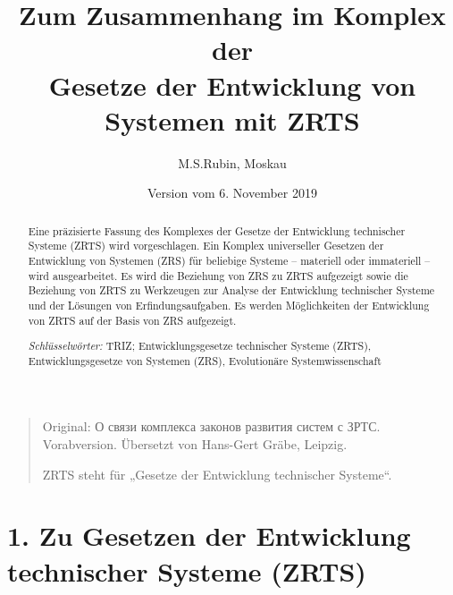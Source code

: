 \documentclass[11pt,a4paper]{article}
\title{Zum Zusammenhang im Komplex der\\ Gesetze der Entwicklung von Systemen
  mit ZRTS}
\author{M.S.Rubin, Moskau}
\date{Version vom 6. November 2019}
\begin{document}
\maketitle
\begin{quote}
  Original: \foreignlanguage{russian}{О связи комплекса законов развития
    систем с ЗРТС}.  Vorabversion. Übersetzt von Hans-Gert Gräbe, Leipzig.

  ZRTS steht für „Gesetze der Entwicklung technischer Systeme“. 
\end{quote}

\begin{abstract}
  Eine präzisierte Fassung des Komplexes der Gesetze der Entwicklung
  technischer Systeme (ZRTS) wird vorgeschlagen.  Ein Komplex universeller
  Gesetzen der Entwicklung von Systemen (ZRS) für beliebige Systeme --
  materiell oder immateriell -- wird ausgearbeitet. Es wird die Beziehung von
  ZRS zu ZRTS aufgezeigt sowie die Beziehung von ZRTS zu Werkzeugen zur
  Analyse der Entwicklung technischer Systeme und der Lösungen von
  Erfindungsaufgaben. Es werden Möglichkeiten der Entwicklung von ZRTS auf der
  Basis von ZRS aufgezeigt.

  \emph{Schlüsselwörter:} TRIZ; Entwicklungsgesetze technischer Systeme
  (ZRTS), Entwicklungsgesetze von Systemen (ZRS), Evolutionäre
  Systemwissenschaft
\end{abstract}

\section*{1. Zu Gesetzen der Entwicklung technischer Systeme (ZRTS)}
\end{document}
